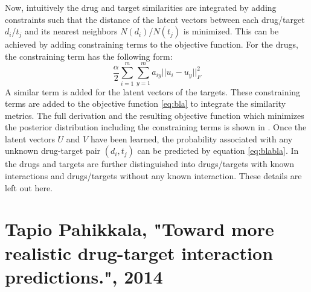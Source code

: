 Now, intuitively the drug and target similarities are integrated by adding constraints such that the distance of the latent vectors between each drug/target $d_i$/$t_j$ and its nearest neighbors $N(d_i)$/$N(t_j)$ is minimized. This can be achieved by adding constraining terms to the objective function. For the drugs, the constraining term has the following form:
\begin{equation}
\frac{\alpha}{2}\sum\limits_{i=1}^{m}\sum\limits_{y=1}^{m}a_{iy}||u_i - u_y||_F^2
\end{equation}
A similar term is added for the latent vectors of the targets. These constraining terms are added to the objective function \ref{eq:bla} to integrate the similarity metrics. The full derivation and the resulting objective function which minimizes the posterior distribution including the constraining terms is shown in \cite{liu2016neighborhood}. Once the latent vectors $U$ and $V$ have been learned, the probability associated with any unknown drug-target pair $(d_i, t_j)$ can be predicted by equation \ref{eq:blabla}. In \cite{liu2016neighborhood} the drugs and targets are further distinguished into drugs/targets with known interactions and drugs/targets without any known interaction. These details are left out here.

\section{Tapio Pahikkala, "Toward more realistic drug-target interaction predictions.", 2014}

